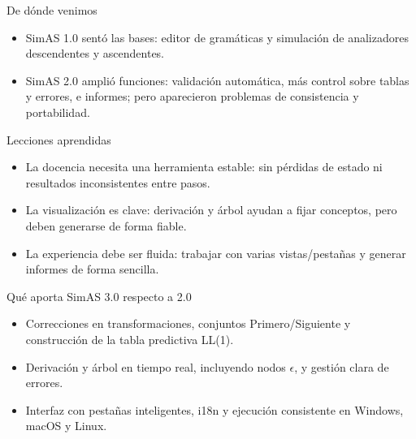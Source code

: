 \begin{frame}{De dónde venimos}
  \begin{itemize}
    \item SimAS 1.0 sentó las bases: editor de gramáticas y simulación de analizadores descendentes y ascendentes.
    \item SimAS 2.0 amplió funciones: validación automática, más control sobre tablas y errores, e informes; pero aparecieron problemas de consistencia y portabilidad.
  \end{itemize}
\end{frame}

\begin{frame}{Lecciones aprendidas}
  \begin{itemize}
    \item La docencia necesita una herramienta estable: sin pérdidas de estado ni resultados inconsistentes entre pasos.
    \item La visualización es clave: derivación y árbol ayudan a fijar conceptos, pero deben generarse de forma fiable.
    \item La experiencia debe ser fluida: trabajar con varias vistas/pestañas y generar informes de forma sencilla.
  \end{itemize}
\end{frame}

\begin{frame}{Qué aporta SimAS 3.0 respecto a 2.0}
  \begin{itemize}
    \item Correcciones en transformaciones, conjuntos Primero/Siguiente y construcción de la tabla predictiva LL(1).
    \item Derivación y árbol en tiempo real, incluyendo nodos \(\epsilon\), y gestión clara de errores.
    \item Interfaz con pestañas inteligentes, i18n y ejecución consistente en Windows, macOS y Linux.
  \end{itemize}
\end{frame}


